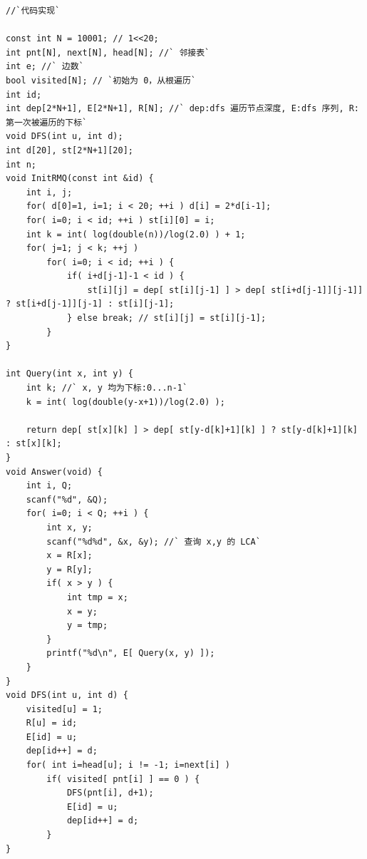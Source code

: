 \documentclass[a4paper]{article}
\begin{document}
\begin{CJK*}{UTF8}{gbsn}
\begin{multicols}{3}
\begin{flushleft}
\begin{lstlisting}
//`代码实现`

const int N = 10001; // 1<<20;
int pnt[N], next[N], head[N]; //` 邻接表`
int e; //` 边数`
bool visited[N]; // `初始为 0，从根遍历`
int id;
int dep[2*N+1], E[2*N+1], R[N]; //` dep:dfs 遍历节点深度, E:dfs 序列, R:第一次被遍历的下标`
void DFS(int u, int d);
int d[20], st[2*N+1][20];
int n;
void InitRMQ(const int &id) {
    int i, j;
    for( d[0]=1, i=1; i < 20; ++i ) d[i] = 2*d[i-1];
    for( i=0; i < id; ++i ) st[i][0] = i;
    int k = int( log(double(n))/log(2.0) ) + 1;
    for( j=1; j < k; ++j )
        for( i=0; i < id; ++i ) {
            if( i+d[j-1]-1 < id ) {
                st[i][j] = dep[ st[i][j-1] ] > dep[ st[i+d[j-1]][j-1]] ? st[i+d[j-1]][j-1] : st[i][j-1];
            } else break; // st[i][j] = st[i][j-1];
        }
}

int Query(int x, int y) {
    int k; //` x, y 均为下标:0...n-1`
    k = int( log(double(y-x+1))/log(2.0) );

    return dep[ st[x][k] ] > dep[ st[y-d[k]+1][k] ] ? st[y-d[k]+1][k] : st[x][k];
}
void Answer(void) {
    int i, Q;
    scanf("%d", &Q);
    for( i=0; i < Q; ++i ) {
        int x, y;
        scanf("%d%d", &x, &y); //` 查询 x,y 的 LCA`
        x = R[x];
        y = R[y];
        if( x > y ) {
            int tmp = x;
            x = y;
            y = tmp;
        }
        printf("%d\n", E[ Query(x, y) ]);
    }
}
void DFS(int u, int d) {
    visited[u] = 1;
    R[u] = id;
    E[id] = u;
    dep[id++] = d;
    for( int i=head[u]; i != -1; i=next[i] )
        if( visited[ pnt[i] ] == 0 ) {
            DFS(pnt[i], d+1);
            E[id] = u;
            dep[id++] = d;
        }
}
\end{lstlisting}


\end{flushleft}
\end{multicols}
\end{CJK*}
\end{document}
